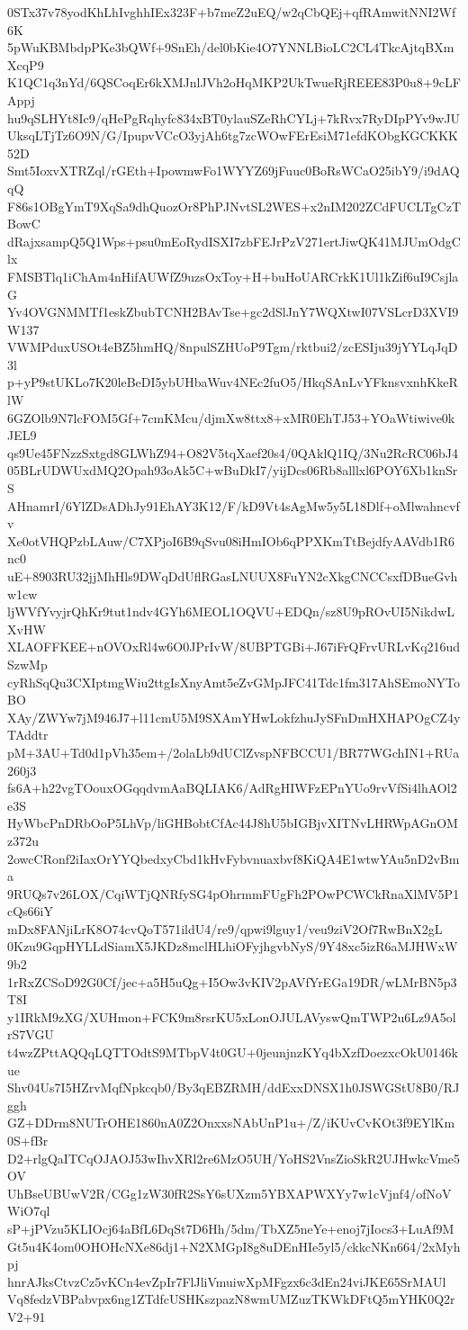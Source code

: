 0STx37v78yodKhLhIvghhIEx323F+b7meZ2uEQ/w2qCbQEj+qfRAmwitNNI2Wf6K
5pWuKBMbdpPKe3bQWf+9SnEh/del0bKie4O7YNNLBioLC2CL4TkcAjtqBXmXcqP9
K1QC1q3nYd/6QSCoqEr6kXMJnlJVh2oHqMKP2UkTwueRjREEE83P0u8+9cLFAppj
hu9qSLHYt8Ic9/qHePgRqhyfc834xBT0ylauSZeRhCYLj+7kRvx7RyDIpPYv9wJU
UksqLTjTz6O9N/G/IpupvVCcO3yjAh6tg7zcWOwFErEsiM71efdKObgKGCKKK52D
Smt5IoxvXTRZql/rGEth+IpowmwFo1WYYZ69jFuuc0BoRsWCaO25ibY9/i9dAQqQ
F86s1OBgYmT9XqSa9dhQuozOr8PhPJNvtSL2WES+x2nIM202ZCdFUCLTgCzTBowC
dRajxsampQ5Q1Wps+psu0mEoRydISXI7zbFEJrPzV271ertJiwQK41MJUmOdgClx
FMSBTlq1iChAm4nHifAUWfZ9uzsOxToy+H+buHoUARCrkK1Ul1kZif6uI9CsjlaG
Yv4OVGNMMTf1eskZbubTCNH2BAvTse+gc2dSlJnY7WQXtwI07VSLcrD3XVI9W137
VWMPduxUSOt4eBZ5hmHQ/8npulSZHUoP9Tgm/rktbui2/zcESIju39jYYLqJqD3l
p+yP9stUKLo7K20leBeDI5ybUHbaWuv4NEc2fuO5/HkqSAnLvYFknsvxnhKkeRlW
6GZOlb9N7lcFOM5Gf+7cmKMcu/djmXw8ttx8+xMR0EhTJ53+YOaWtiwive0kJEL9
qs9Ue45FNzzSxtgd8GLWhZ94+O82V5tqXaef20s4/0QAklQ1IQ/3Nu2RcRC06bJ4
05BLrUDWUxdMQ2Opah93oAk5C+wBuDkI7/yijDcs06Rb8alllxl6POY6Xb1knSrS
AHnamrI/6YlZDsADhJy91EhAY3K12/F/kD9Vt4sAgMw5y5L18Dlf+oMlwahncvfv
Xe0otVHQPzbLAuw/C7XPjoI6B9qSvu08iHmIOb6qPPXKmTtBejdfyAAVdb1R6nc0
uE+8903RU32jjMhHls9DWqDdUflRGasLNUUX8FuYN2cXkgCNCCsxfDBueGvhw1cw
ljWVfYvyjrQhKr9tut1ndv4GYh6MEOL1OQVU+EDQn/sz8U9pROvUI5NikdwLXvHW
XLAOFFKEE+nOVOxRl4w6O0JPrIvW/8UBPTGBi+J67iFrQFrvURLvKq216udSzwMp
cyRhSqQu3CXIptmgWiu2ttgIsXnyAmt5eZvGMpJFC41Tdc1fm317AhSEmoNYToBO
XAy/ZWYw7jM946J7+l11cmU5M9SXAmYHwLokfzhuJySFnDmHXHAPOgCZ4yTAddtr
pM+3AU+Td0d1pVh35em+/2olaLb9dUClZvspNFBCCU1/BR77WGchIN1+RUa260j3
fs6A+h22vgTOouxOGqqdvmAaBQLIAK6/AdRgHIWFzEPnYUo9rvVfSi4lhAOl2e3S
HyWbcPnDRbOoP5LhVp/liGHBobtCfAc44J8hU5bIGBjvXITNvLHRWpAGnOMz372u
2owcCRonf2iIaxOrYYQbedxyCbd1kHvFybvnuaxbvf8KiQA4E1wtwYAu5nD2vBma
9RUQs7v26LOX/CqiWTjQNRfySG4pOhrmmFUgFh2POwPCWCkRnaXlMV5P1cQs66iY
mDx8FANjiLrK8O74cvQoT571ildU4/re9/qpwi9lguy1/veu9ziV2Of7RwBnX2gL
0Kzu9GqpHYLLdSiamX5JKDz8mclHLhiOFyjhgvbNyS/9Y48xc5izR6aMJHWxW9b2
1rRxZCSoD92G0Cf/jec+a5H5uQg+I5Ow3vKIV2pAVfYrEGa19DR/wLMrBN5p3T8I
y1IRkM9zXG/XUHmon+FCK9m8rsrKU5xLonOJULAVyswQmTWP2u6Lz9A5olrS7VGU
t4wzZPttAQQqLQTTOdtS9MTbpV4t0GU+0jeunjnzKYq4bXzfDoezxcOkU0146kue
Shv04Us7I5HZrvMqfNpkcqb0/By3qEBZRMH/ddExxDNSX1h0JSWGStU8B0/RJggh
GZ+DDrm8NUTrOHE1860nA0Z2OnxxsNAbUnP1u+/Z/iKUvCvKOt3f9EYlKm0S+fBr
D2+rlgQaITCqOJAOJ53wIhvXRl2re6MzO5UH/YoHS2VnsZioSkR2UJHwkcVme5OV
UhBseUBUwV2R/CGg1zW30fR2SsY6sUXzm5YBXAPWXYy7w1cVjnf4/ofNoVWiO7ql
sP+jPVzu5KLIOcj64aBfL6DqSt7D6Hh/5dm/TbXZ5neYe+enoj7jIocs3+LuAf9M
Gt5u4K4om0OHOHcNXe86dj1+N2XMGpI8g8uDEnHIe5yl5/ckkcNKn664/2xMyhpj
hnrAJksCtvzCz5vKCn4evZpIr7FlJliVmuiwXpMFgzx6c3dEn24viJKE65SrMAUl
Vq8fedzVBPabvpx6ng1ZTdfcUSHKszpazN8wmUMZuzTKWkDFtQ5mYHK0Q2rV2+91

